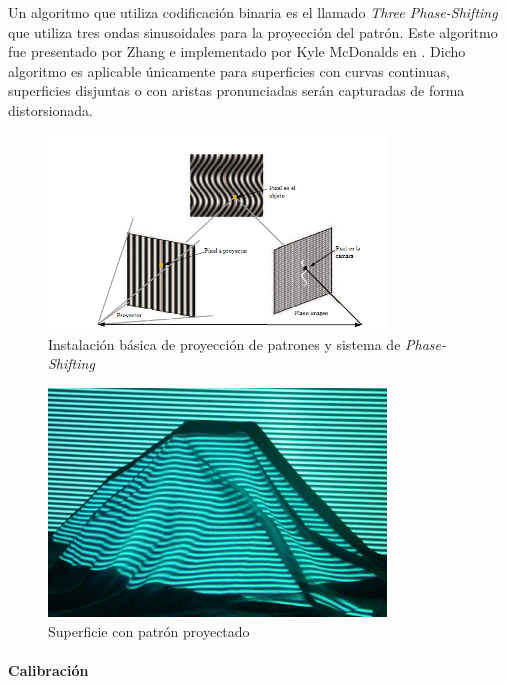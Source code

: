 Un algoritmo que utiliza codificación binaria es el llamado \emph{Three Phase-Shifting} que utiliza tres ondas sinusoidales para la proyección del patrón. Este algoritmo fue presentado por Zhang\cite{ZhangS} e implementado por Kyle McDonalds en \cite{KyleMcDonald}. Dicho algoritmo es aplicable únicamente para superficies con curvas continuas, superficies disjuntas o con aristas pronunciadas serán capturadas de forma distorsionada.
\begin{figure}[H]
  \centering
    \includegraphics[width=0.8\textwidth]{./Cap2_videomapping/diagramaLS.png}
  \caption[Recent progresses on real-time 3D shape measurement using digital fringe projection techniques]{Instalación básica de proyección de patrones y sistema de \emph{Phase-Shifting}}
  \label{fig:phase21}
\end{figure}
\begin{figure}[H]
  \centering
    \includegraphics[width=0.8\textwidth]{./Cap2_videomapping/phase2.jpg}
  \caption[Imagen propia.]{Superficie con patrón proyectado}
  \label{fig:phase2}
\end{figure}

\paragraph{Calibración}

